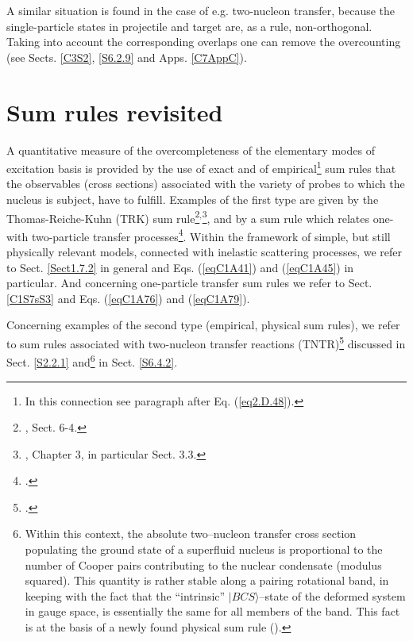 A similar situation is found in the case of e.g. two-nucleon transfer, because the single-particle states in projectile and target are, as a rule, non-orthogonal. Taking into account the corresponding  overlaps one can remove the overcounting (see Sects. \ref{C3S2}, \ref{S6.2.9} and Apps. \ref{C7AppC}).


\section{Sum rules revisited}\label{C1S2}
A quantitative measure of the overcompleteness of  the elementary modes of excitation basis is provided by the use of exact and of empirical\footnote{In this connection see paragraph after Eq. (\ref{eq2.D.48}).}  sum rules that the observables (cross sections) associated with the variety of probes to which the nucleus is subject, have to fulfill. Examples of the first type are given by the Thomas-Reiche-Kuhn (TRK) sum rule\footnote{\cite{Bohr:75}, Sect. 6-4.}$^,$\footnote{\cite{Bertsch:05}, Chapter 3, in particular Sect. 3.3.}, and by a sum rule which relates one- with two-particle transfer processes\footnote{\cite{Bayman:72,Lanford:77}.}. Within the framework of simple, but still physically relevant models, connected with inelastic scattering processes, we refer to Sect. \ref{Sect1.7.2} in general and Eqs.  (\ref{eqC1A41}) and (\ref{eqC1A45}) in particular. And concerning one-particle transfer sum rules we refer to Sect. \ref{C1S7sS3} and Eqs. (\ref{eqC1A76}) and (\ref{eqC1A79}).


 Concerning examples of the second type (empirical, physical sum rules), we refer to sum rules associated with two-nucleon transfer reactions (TNTR)\footnote{\cite{Broglia:72b}.} discussed in Sect. \ref{S2.2.1} and\footnote{Within this context, the absolute two--nucleon transfer cross section populating the ground state of a superfluid nucleus is proportional to the number of Cooper pairs contributing to the nuclear condensate (modulus squared). This quantity is rather stable along a pairing rotational band, in keeping with the fact that the ``intrinsic'' $|BCS\rangle$--state of the deformed system in gauge space, is essentially the same for all members of the band. This fact is at the basis of a newly found physical sum rule \mbox{(\cite{Potel:17})}.} in Sect. \ref{S6.4.2}.












